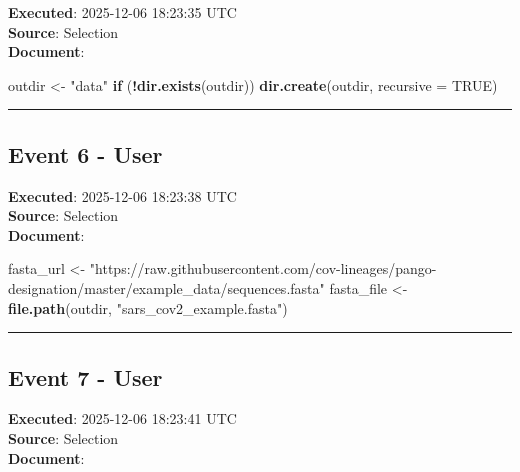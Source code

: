 \documentclass[
  11pt,
]{article}
\newenvironment{Shaded}{\begin{snugshade}}{\end{snugshade}}
\newcommand{\AttributeTok}[1]{\textcolor[rgb]{0.13,0.29,0.53}{#1}}
\newcommand{\ConstantTok}[1]{\textcolor[rgb]{0.56,0.35,0.01}{#1}}
\newcommand{\ControlFlowTok}[1]{\textcolor[rgb]{0.13,0.29,0.53}{\textbf{#1}}}
\newcommand{\FunctionTok}[1]{\textcolor[rgb]{0.13,0.29,0.53}{\textbf{#1}}}
\newcommand{\NormalTok}[1]{#1}
\newcommand{\OtherTok}[1]{\textcolor[rgb]{0.56,0.35,0.01}{#1}}
\newcommand{\SpecialCharTok}[1]{\textcolor[rgb]{0.81,0.36,0.00}{\textbf{#1}}}
\newcommand{\StringTok}[1]{\textcolor[rgb]{0.31,0.60,0.02}{#1}}
\begin{document}
\textbf{Executed}: 2025-12-06 18:23:35 UTC\\
\textbf{Source}: Selection\\
\textbf{Document}:

\begin{Shaded}
\begin{Highlighting}[]
\NormalTok{outdir }\OtherTok{\textless{}{-}} \StringTok{"data"}
\ControlFlowTok{if}\NormalTok{ (}\SpecialCharTok{!}\FunctionTok{dir.exists}\NormalTok{(outdir)) }\FunctionTok{dir.create}\NormalTok{(outdir, }\AttributeTok{recursive =} \ConstantTok{TRUE}\NormalTok{)}
\end{Highlighting}
\end{Shaded}

\begin{center}\rule{0.5\linewidth}{0.5pt}\end{center}

\subsection{Event 6 - User}\label{event-6---user}

\textbf{Executed}: 2025-12-06 18:23:38 UTC\\
\textbf{Source}: Selection\\
\textbf{Document}:

\begin{Shaded}
\begin{Highlighting}[]
\NormalTok{fasta\_url }\OtherTok{\textless{}{-}} \StringTok{"https://raw.githubusercontent.com/cov{-}lineages/pango{-}designation/master/example\_data/sequences.fasta"}
\NormalTok{fasta\_file }\OtherTok{\textless{}{-}} \FunctionTok{file.path}\NormalTok{(outdir, }\StringTok{"sars\_cov2\_example.fasta"}\NormalTok{)}
\end{Highlighting}
\end{Shaded}

\begin{center}\rule{0.5\linewidth}{0.5pt}\end{center}

\subsection{Event 7 - User}\label{event-7---user}

\textbf{Executed}: 2025-12-06 18:23:41 UTC\\
\textbf{Source}: Selection\\
\textbf{Document}:
\end{document}
